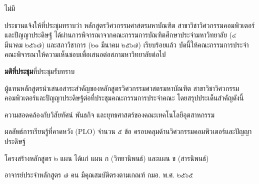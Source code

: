 \documentclass{meetingminutes}
\begin{document}
\maketitle

\begin{participants}
\end{participants}

\noindent ไม่มี\par

\startmeeting
{}


ประธานแจ้งให้ที่ประชุมทราบว่า หลักสูตรวิศวกรรมศาสตรมหาบัณฑิต สาขาวิชาวิศวกรรมคอมพิวเตอร์และปัญญาประดิษฐ์
ได้ผ่านการพิจารณาจากคณะกรรมการบัณฑิตศึกษาประจำมหาวิทยาลัย (๔ มีนาคม ๒๕๖๗) และสภาวิชาการ (๒๑ มีนาคม ๒๕๖๗)
เรียบร้อยแล้ว บัดนี้ให้คณะกรรมการประจำคณะพิจารณาให้ความเห็นชอบเพื่อเสนอต่อสภามหาวิทยาลัยต่อไป

\noindent\textbf{มติที่ประชุม}\quad ที่ประชุมรับทราบ


ผู้แทนหลักสูตรนำเสนอสาระสำคัญของหลักสูตรวิศวกรรมศาสตรมหาบัณฑิต
สาขาวิชาวิศวกรรมคอมพิวเตอร์และปัญญาประดิษฐ์ต่อที่ประชุมคณะกรรมการประจำคณะ
โดยสรุปประเด็นสำคัญดังนี้

\begin{thailist}
  \item ความสอดคล้องกับวิสัยทัศน์ พันธกิจ และยุทธศาสตร์ของคณะเทคโนโลยีอุตสาหกรรม
  \item ผลลัพธ์การเรียนรู้ที่คาดหวัง (PLO) จำนวน ๕ ข้อ ครอบคลุมด้านวิศวกรรมคอมพิวเตอร์และปัญญาประดิษฐ์
  \item โครงสร้างหลักสูตร ๒ แผน ได้แก่ แผน ก (วิทยานิพนธ์) และแผน ข (สารนิพนธ์)
  \item อาจารย์ประจำหลักสูตร ๗ คน มีคุณสมบัติตรงตามเกณฑ์ กมอ. พ.ศ. ๒๕๖๕
\end{thailist}
\end{document}
